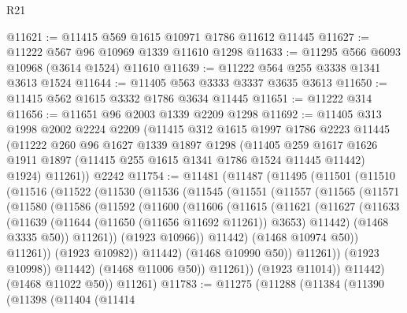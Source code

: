 \begin{lexlean}{R21}
\begin{coremodule}
@11621 := @11415 @569 @1615 @10971 @1786 @11612 @11445
@11627 := @11222 @567 @96 @10969 @1339 @11610 @1298
@11633 := @11295 @566 @6093 @10968 (@3614 @1524) @11610
@11639 := @11222 @564 @255 @3338 @1341 @3613 @1524
@11644 := @11405 @563 @3333 @3337 @3635 @3613
@11650 := @11415 @562 @1615 @3332 @1786 @3634 @11445
@11651 := @11222 @314
@11656 := @11651 @96 @2003 @1339 @2209 @1298
@11692 := @11405
    @313
    @1998
    @2002
    @2224
    @2209
    (@11415
      @312
      @1615
      @1997
      @1786
      @2223
      @11445
      (@11222
        @260
        @96
        @1627
        @1339
        @1897
        @1298
        (@11405
          @259
          @1617
          @1626
          @1911
          @1897
          (@11415 @255 @1615 @1341 @1786 @1524 @11445 @11442)
          @1924)
        @11261))
    @2242
@11754 := @11481
    (@11487
      (@11495
        (@11501
          (@11510
            (@11516
              (@11522
                (@11530
                  (@11536
                    (@11545
                      (@11551
                        (@11557
                          (@11565
                            (@11571
                              (@11580
                                (@11586
                                  (@11592
                                    (@11600
                                      (@11606
                                        (@11615
                                          (@11621
                                            (@11627
                                              (@11633
                                                (@11639
                                                  (@11644 (@11650 (@11656 @11692 @11261)) @3653)
                                                  @11442)
                                                (@1468 @3335 @50))
                                              @11261))
                                          (@1923 @10966))
                                        @11442)
                                      (@1468 @10974 @50))
                                    @11261))
                                (@1923 @10982))
                              @11442)
                            (@1468 @10990 @50))
                          @11261))
                      (@1923 @10998))
                    @11442)
                  (@1468 @11006 @50))
                @11261))
            (@1923 @11014))
          @11442)
        (@1468 @11022 @50))
      @11261)
@11783 := @11275
    (@11288
      (@11384
        (@11390
          (@11398
            (@11404
              (@11414

\end{coremodule}
\end{lexlean}
